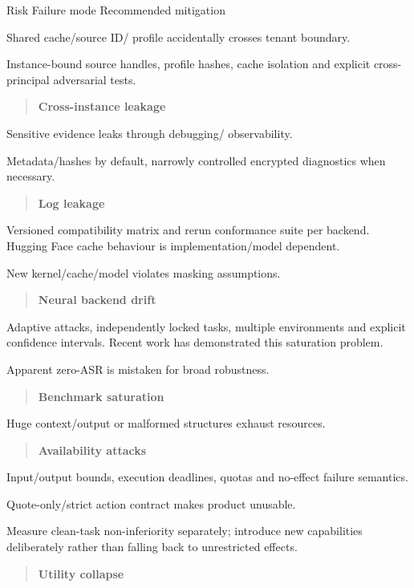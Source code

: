 \documentclass[11pt,a4paper]{article}
\begin{document}
Risk Failure mode Recommended mitigation\par
Shared cache/source ID/ profile accidentally crosses tenant boundary.\par
Instance-bound source handles, profile hashes, cache isolation and explicit cross-principal adversarial tests.\par
\begin{quote}\textbf{Cross-instance leakage}\end{quote}
Sensitive evidence leaks through debugging/ observability.\par
Metadata/hashes by default, narrowly controlled encrypted diagnostics when necessary.\par
\begin{quote}\textbf{Log leakage}\end{quote}
Versioned compatibility matrix and rerun conformance suite per backend. Hugging Face cache behaviour is implementation/model dependent.\par
New kernel/cache/model violates masking assumptions.\par
\begin{quote}\textbf{Neural backend drift}\end{quote}
Adaptive attacks, independently locked tasks, multiple environments and explicit confidence intervals. Recent work has demonstrated this saturation problem.\par
Apparent zero-ASR is mistaken for broad robustness.\par
\begin{quote}\textbf{Benchmark saturation}\end{quote}
Huge context/output or malformed structures exhaust resources.\par
\begin{quote}\textbf{Availability attacks}\end{quote}
Input/output bounds, execution deadlines, quotas and no-effect failure semantics.\par
Quote-only/strict action contract makes product unusable.\par
Measure clean-task non-inferiority separately; introduce new capabilities deliberately rather than falling back to unrestricted effects.\par
\begin{quote}\textbf{Utility collapse}\end{quote}
\end{document}
